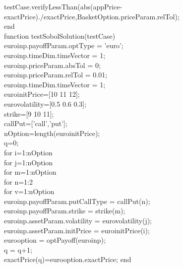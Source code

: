 \documentclass[]{elsarticle}
\theoremstyle{definition}
\theoremstyle{remark}
\begin{document}
              testCase.verifyLessThan(abs(appPrice-exactPrice)./exactPrice,BasketOption.priceParam.relTol);\\
          end\\
          
          function testSobolSolution(testCase)\\
              euroinp.payoffParam.optType = {'euro'};\\
              euroinp.timeDim.timeVector = 1;\\
              euroinp.priceParam.absTol = 0;\\
              euroinp.priceParam.relTol = 0.01;\\
              euroinp.timeDim.timeVector = 1;\\
              euroinitPrice=[10 11 12];\\
              eurovolatility=[0.5 0.6 0.3];\\
              strike=[9 10 11];\\
              callPut=[{'call'},{'put'}];\\
              nOption=length(euroinitPrice);\\
              q=0;\\
              for i=1:nOption\\
                  for j=1:nOption\\
                      for m=1:nOption\\
                          for n=1:2\\
                              for v=1:nOption\\
                              euroinp.payoffParam.putCallType = callPut(n);\\
                              euroinp.payoffParam.strike = strike(m);\\
                              euroinp.assetParam.volatility = eurovolatility(j);\\
                              euroinp.assetParam.initPrice = euroinitPrice(i);\\
                              eurooption = optPayoff(euroinp);\\
                              q = q+1;\\
                              exactPrice(q)=eurooption.exactPrice;
                              end\\
\end{document}
